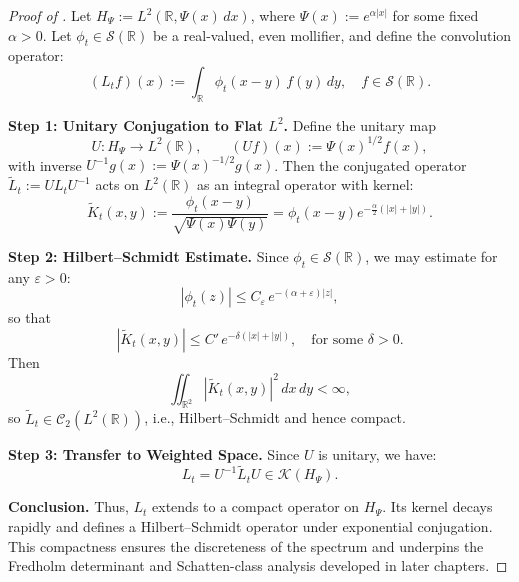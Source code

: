 \begin{proof}[Proof of ]
Let \( H_\Psi := L^2(\mathbb{R}, \Psi(x)\, dx) \), where \( \Psi(x) := e^{\alpha |x|} \) for some fixed \( \alpha > 0 \). Let \( \phi_t \in \mathcal{S}(\mathbb{R}) \) be a real-valued, even mollifier, and define the convolution operator:
\[
(L_t f)(x) := \int_{\mathbb{R}} \phi_t(x - y)\, f(y)\, dy, \quad f \in \mathcal{S}(\mathbb{R}).
\]

\medskip
\noindent\textbf{Step 1: Unitary Conjugation to Flat \( L^2 \).}
Define the unitary map
\[
U \colon H_\Psi \to L^2(\mathbb{R}), \qquad (Uf)(x) := \Psi(x)^{1/2} f(x),
\]
with inverse \( U^{-1} g(x) := \Psi(x)^{-1/2} g(x) \). Then the conjugated operator \( \widetilde{L}_t := U L_t U^{-1} \) acts on \( L^2(\mathbb{R}) \) as an integral operator with kernel:
\[
\widetilde{K}_t(x,y) := \frac{\phi_t(x - y)}{\sqrt{\Psi(x)\Psi(y)}} = \phi_t(x - y) e^{-\frac{\alpha}{2}(|x| + |y|)}.
\]

\medskip
\noindent\textbf{Step 2: Hilbert–Schmidt Estimate.}
Since \( \phi_t \in \mathcal{S}(\mathbb{R}) \), we may estimate for any \( \varepsilon > 0 \):
\[
|\phi_t(z)| \le C_\varepsilon\, e^{-(\alpha + \varepsilon)|z|},
\]
so that
\[
|\widetilde{K}_t(x,y)| \le C'\, e^{-\delta(|x| + |y|)}, \quad \text{for some } \delta > 0.
\]
Then
\[
\iint_{\mathbb{R}^2} |\widetilde{K}_t(x,y)|^2\, dx\, dy < \infty,
\]
so \( \widetilde{L}_t \in \mathcal{C}_2(L^2(\mathbb{R})) \), i.e., Hilbert–Schmidt and hence compact.

\medskip
\noindent\textbf{Step 3: Transfer to Weighted Space.}
Since \( U \) is unitary, we have:
\[
L_t = U^{-1} \widetilde{L}_t U \in \mathcal{K}(H_\Psi).
\]

\medskip
\noindent\textbf{Conclusion.}
Thus, \( L_t \) extends to a compact operator on \( H_\Psi \). Its kernel decays rapidly and defines a Hilbert–Schmidt operator under exponential conjugation. This compactness ensures the discreteness of the spectrum and underpins the Fredholm determinant and Schatten-class analysis developed in later chapters.
\end{proof}
